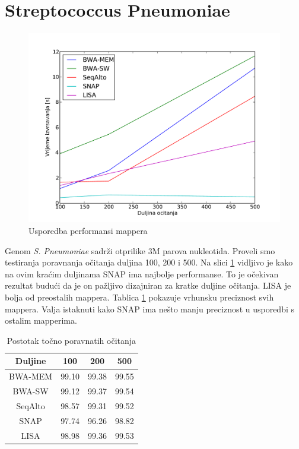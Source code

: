 \documentclass[times, utf8, diplomski]{fer}
\begin{document}
\section {Streptococcus Pneumoniae}

\begin{figure}[H]
\centering
\includegraphics[width=1.0\textwidth]{../img/streptococcus-time.pdf}
\caption{Usporedba performansi mappera}\label{streptococcus-time}
\end{figure}

Genom \emph{S. Pneumoniae} sadrži otprilike 3M parova nukleotida. Proveli smo testiranja poravnanja očitanja duljina 100, 200 i 500. Na slici \ref{streptococcus-time} vidljivo je kako na ovim kraćim duljinama SNAP ima najbolje performanse. To je očekivan rezultat budući da je on pažljivo dizajniran za kratke duljine očitanja. LISA je bolja od preostalih mappera. Tablica \ref{streptococcus-correct} pokazuje vrhunsku preciznost svih mappera. Valja istaknuti kako SNAP ima nešto manju preciznost u usporedbi s ostalim mapperima.

\begin{table}[H]
\centering
\begin{tabular}{|c||c|c|c|}
\hline
	Duljine & 100 & 200 & 500\\
\hline
\hline
	BWA-MEM & 99.10 & 99.38 & 99.55\\
\hline
	BWA-SW  & 99.12 & 99.37 & 99.54\\
\hline
	SeqAlto & 98.57 & 99.31 & 99.52\\
\hline
	SNAP    & 97.74 & 96.26 & 98.82\\
\hline
	LISA    & 98.98 & 99.36 & 99.53\\
\hline
\end{tabular}
\caption{Postotak točno poravnatih očitanja}\label{streptococcus-correct}
\end{table}
\end{document}
